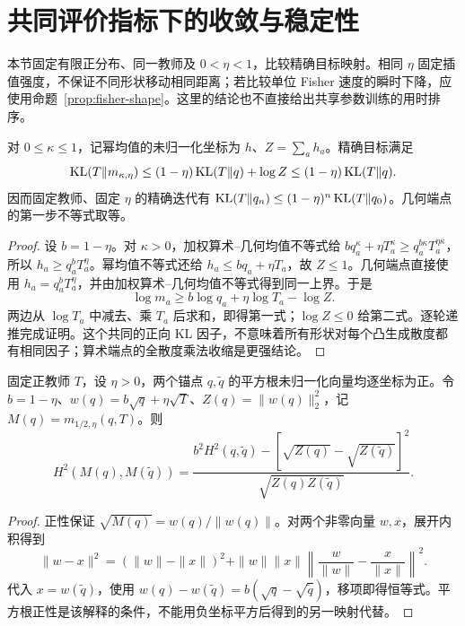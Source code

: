 \section{共同评价指标下的收敛与稳定性}
\label{sec:shape-comparison}
本节固定有限正分布、同一教师及 $0<\eta<1$，比较精确目标映射。相同 $\eta$ 固定插值强度，不保证不同形状移动相同距离；若比较单位 Fisher 速度的瞬时下降，应使用命题~\ref{prop:fisher-shape}。这里的结论也不直接给出共享参数训练的用时排序。

\begin{theorem}
\label{thm:forward-kl-contraction}
对 $0\le\kappa\le1$，记幂均值的未归一化坐标为 $h$、$Z=\sum_a h_a$。精确目标满足
\begin{equation}
\operatorname{KL}(T\Vert m_{\kappa,\eta})
\le(1-\eta)\operatorname{KL}(T\Vert q)+\log Z
\le(1-\eta)\operatorname{KL}(T\Vert q).
\end{equation}
因而固定教师、固定 $\eta$ 的精确迭代有 $\operatorname{KL}(T\Vert q_n)\le(1-\eta)^n\operatorname{KL}(T\Vert q_0)$。几何端点的第一步不等式取等。
\end{theorem}
\begin{proof}
设 $b=1-\eta$。对 $\kappa>0$，加权算术--几何均值不等式给 $bq_a^\kappa+\eta T_a^\kappa\ge q_a^{b\kappa}T_a^{\eta\kappa}$，所以 $h_a\ge q_a^bT_a^\eta$。幂均值不等式还给 $h_a\le bq_a+\eta T_a$，故 $Z\le1$。几何端点直接使用 $h_a=q_a^bT_a^\eta$，并由加权算术--几何均值不等式得到同一上界。于是
\begin{equation}
\log m_a\ge b\log q_a+\eta\log T_a-\log Z.
\end{equation}
两边从 $\log T_a$ 中减去、乘 $T_a$ 后求和，即得第一式；$\log Z\le0$ 给第二式。逐轮递推完成证明。这个共同的正向 KL 因子，不意味着所有形状对每个凸生成散度都有相同因子；算术端点的全散度乘法收缩是更强结论。
\end{proof}

\begin{lemma}[平方根目标的双锚点恒等式]
\label{lem:root-two-anchor}
固定正教师 $T$，设 $\eta>0$，两个锚点 $q,\widetilde q$ 的平方根未归一化向量均逐坐标为正。令 $b=1-\eta$、$w(q)=b\sqrt q+\eta\sqrt T$、$Z(q)=\|w(q)\|_2^2$，记 $M(q)=m_{1/2,\eta}(q,T)$。则
\begin{equation}
H^2(M(q),M(\widetilde q))
=\frac{b^2H^2(q,\widetilde q)
-[\sqrt{Z(q)}-\sqrt{Z(\widetilde q)}]^2}
{\sqrt{Z(q)Z(\widetilde q)}}.
\label{eq:root-two-anchor}
\end{equation}
\end{lemma}
\begin{proof}
正性保证 $\sqrt{M(q)}=w(q)/\|w(q)\|$。对两个非零向量 $w,x$，展开内积得到
\begin{equation}
\|w-x\|^2=(\|w\|-\|x\|)^2
+\|w\|\|x\|\left\|\frac{w}{\|w\|}-\frac{x}{\|x\|}\right\|^2.
\end{equation}
代入 $x=w(\widetilde q)$，使用 $w(q)-w(\widetilde q)=b(\sqrt q-\sqrt{\widetilde q})$，移项即得恒等式。平方根正性是该解释的条件，不能用负坐标平方后得到的另一映射代替。
\end{proof}

